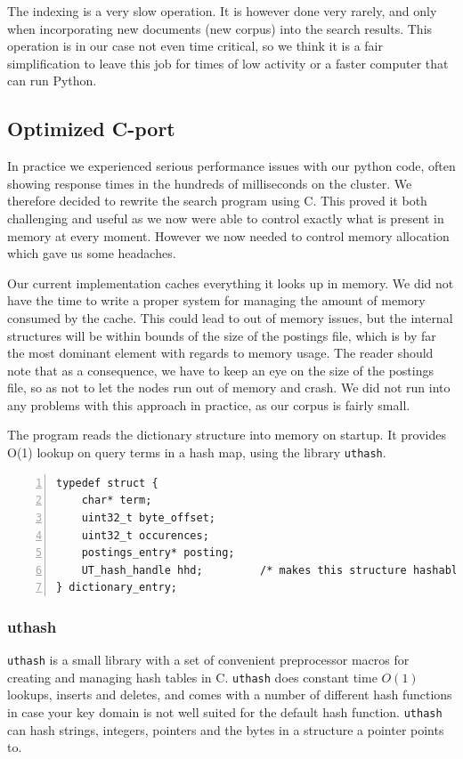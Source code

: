 The indexing is a very slow operation. It is however done very rarely, and only when incorporating new documents (new corpus) into the search results. This operation is in our case not even time critical, so we think it is a fair simplification to leave this job for times of low activity or a faster computer that can run Python.

\subsection{Optimized C-port}
In practice we experienced serious performance issues with our python code, often showing response times in the hundreds of milliseconds on the cluster. We therefore decided to rewrite the search program using C. This proved it both challenging and useful as we now were able to control exactly what is present in memory at every moment. However we now needed to control memory allocation which gave us some headaches.

Our current implementation caches everything it looks up in memory. We did not have the time to write a proper system for managing the amount of memory consumed by the cache.
This could lead to out of memory issues, but the internal structures will be within bounds of the size of the postings file, which is by far the most dominant element with regards to memory usage.
The reader should note that as a consequence, we have to keep an eye on the size of the postings file, so as not to let the nodes run out of memory and crash. We did not run into any problems with this approach in practice, as our corpus is fairly small.

The program reads the dictionary structure into memory on startup. It provides O(1) lookup on query terms in a hash map, using the library {\tt uthash}\cite{uthash}.

\begin{lstlisting}[style=customc,captionpos=b,caption={Structure of a dictionary entry (term)},numbers=left]
typedef struct {
    char* term;
    uint32_t byte_offset;
    uint32_t occurences;
    postings_entry* posting;
    UT_hash_handle hhd;         /* makes this structure hashable */
} dictionary_entry;
\end{lstlisting}
\subsubsection{uthash}
{\tt uthash} is a small library with a set of convenient preprocessor macros for creating and managing hash tables in C.
{\tt uthash} does constant time $O(1)$ lookups, inserts and deletes, and comes with a number of different hash functions in case your key domain is not well suited for the default hash function.
{\tt uthash} can hash strings, integers, pointers and the bytes in a structure a pointer points to.

